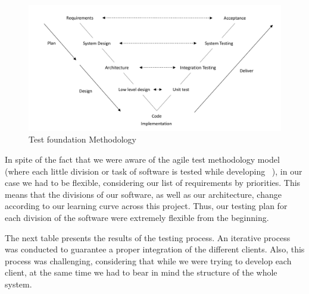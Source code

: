 \begin{figure}[ht]
\centering
\includegraphics[width=1\textwidth]{figs/testing-met}
	\caption{Test foundation Methodology}
	\label{fig:testing}
\end{figure}


In spite of the fact that we were aware of the agile test methodology model (where each little division or task of software is tested while developing ~\cite{rtyeteey}), in our case we had to be flexible, considering our list of requirements by priorities. This means that the divisions of our software, as well as our architecture, change according to our learning curve across this project. Thus, our testing plan for each division of the software were extremely flexible from the beginning.

The next table presents the results of the testing process. An iterative process was conducted to guarantee a proper integration of the different clients.  Also, this process was challenging, considering that while we were trying to develop each client, at the same time we had to bear in mind the structure of the whole system.


